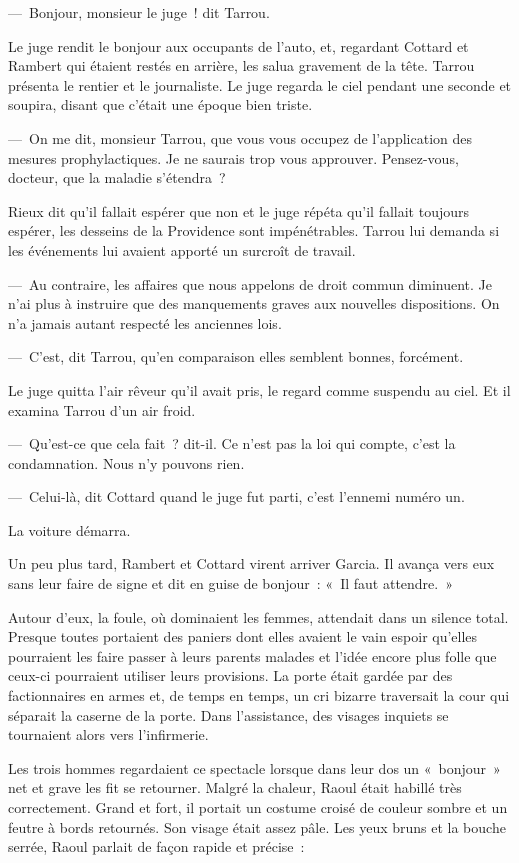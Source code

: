 \documentclass[french,twoside]{book} %
\begin{document}
— Bonjour, monsieur le juge ! dit Tarrou.\par
Le juge rendit le bonjour aux occupants de l’auto, et, regardant Cottard et Rambert qui étaient restés en arrière, les salua gravement de la tête. Tarrou présenta le rentier et le journaliste. Le juge regarda le ciel pendant une seconde et soupira, disant que c’était une époque bien triste.\par
— On me dit, monsieur Tarrou, que vous vous occupez de l’application des mesures prophylactiques. Je ne saurais trop vous approuver. Pensez-vous, docteur, que la maladie s’étendra ?\par
Rieux dit qu’il fallait espérer que non et le juge répéta qu’il fallait toujours espérer, les desseins de la Providence sont impénétrables. Tarrou lui demanda si les événements lui avaient apporté un surcroît de travail.\par
— Au contraire, les affaires que nous appelons de droit commun diminuent. Je n’ai plus à instruire que des manquements graves aux nouvelles dispositions. On n’a jamais autant respecté les anciennes lois.\par
— C’est, dit Tarrou, qu’en comparaison elles semblent bonnes, forcément.\par
Le juge quitta l’air rêveur qu’il avait pris, le regard comme suspendu au ciel. Et il examina Tarrou d’un air froid.\par
— Qu’est-ce que cela fait ? dit-il. Ce n’est pas la loi qui compte, c’est la condamnation. Nous n’y pouvons rien.\par
— Celui-là, dit Cottard quand le juge fut parti, c’est l’ennemi numéro un.\par
La voiture démarra.\par
Un peu plus tard, Rambert et Cottard virent arriver Garcia. Il avança vers eux sans leur faire de signe et dit en guise de bonjour : « Il faut attendre. »\par
Autour d’eux, la foule, où dominaient les femmes, attendait dans un silence total. Presque toutes portaient des paniers dont elles avaient le vain espoir qu’elles pourraient les faire passer à leurs parents malades et l’idée encore plus folle que ceux-ci pourraient utiliser leurs provisions. La porte était gardée par des factionnaires en armes et, de temps en temps, un cri bizarre traversait la cour qui séparait la caserne de la porte. Dans l’assistance, des visages inquiets se tournaient alors vers l’infirmerie.\par
Les trois hommes regardaient ce spectacle lorsque dans leur dos un « bonjour » net et grave les fit se retourner. Malgré la chaleur, Raoul était habillé très correctement. Grand et fort, il portait un costume croisé de couleur sombre et un feutre à bords retournés. Son visage était assez pâle. Les yeux bruns et la bouche serrée, Raoul parlait de façon rapide et précise :\par
\end{document}
